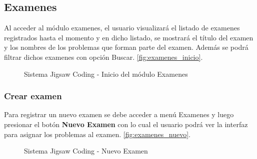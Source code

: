 \subsection{Examenes}
Al acceder al módulo examenes, el usuario visualizará el listado de examenes registrados hasta el momento y en dicho listado, se mostrará el título del examen y los nombres de los problemas que forman parte del examen. Además se podrá filtrar dichos examenes con opción Buscar. \autoref{fig:examenes_inicio}.

\begin{figure}[h!]
	\centering
	\caption[SJC Examenes]{Sistema Jigsaw Coding - Inicio del módulo Examenes}
	\label{fig:examenes_inicio}
\end{figure}
\subsubsection{Crear examen}

Para registrar un nuevo examen se debe acceder a menú Examenes y luego presionar el botón \textbf{Nuevo Examen} con lo cual el usuario podrá ver la interfaz para asignar los problemas al examen. \autoref{fig:examenes_nuevo}. \\

\begin{figure}[h!]
	\centering
	\caption[SJC Nuevo examen]{Sistema Jigsaw Coding - Nuevo Examen}
	\label{fig:examenes_nuevo}
\end{figure}

